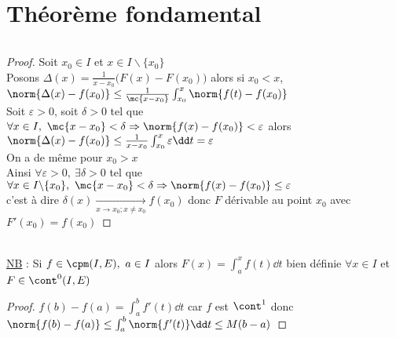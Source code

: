 {\section{Théorème fondamental}
    ${}$ \\ 
    \begin{proof}
    Soit $x_0 \in I$ et $x\in I\backslash \{x_0\}$ \\Posons $\Delta (x) = \frac{1}{x-x_0}\big( F(x) - F(x_0)\big)$ alors si $x_0<x$, 
    $\norm{\Delta (x) - f(x_0)} \leq  \frac{1}{\mc{x-x_0}} \int_{x_0}^x \norm{f(t) - f(x_0)}$ \\ Soit $\varepsilon >0 $, soit $\delta >0$ tel 
    que $\forall x\in I ,~\mc{x-x_0} <\delta \Rightarrow \norm{f(x)-f(x_0)} <\varepsilon$ alors \\$\norm{\Delta (x) - f(x_0)} \leq 
    \frac{1}{x-x_0} \int_{x_0}^x \varepsilon \dd t = \varepsilon$ \\ On a de même pour $x_0 > x$\\
    Ainsi $\forall \varepsilon > 0 ,~\exists \delta >0$ tel que $\forall x\in I \backslash \{x_0\} ,~\mc{x-x_0} <\delta \Rightarrow 
    \norm{f(x) - f(x_0)} \leq \varepsilon$ \\c'est à dire $\delta (x) \underset{x\rightarrow x_0 ; x\neq x_0}{\longrightarrow} f(x_0)$ donc $F$ 
    dérivable au point $x_0$ avec $F'(x_0) = f(x_0)$
    \end{proof}
    ${}$ \\ 
    \\ {\small\underline{NB} : Si $f\in\cpm (I,E) ,~a\in I$ alors $F(x) = \int_a^x f(t) \dd t$ bien définie $\forall x\in I$ et 
    $F\in\cont^0(I,E)$}
    \vspace*{0.5cm} \\ 
    \begin{proof}
    $f(b)-f(a) = \int_a^b f'(t) \dd t $ car $f$ est $\cont^1$ donc $\norm{f(b)-f(a)} \leq \int_a^b \norm{f'(t)}\dd t \leq M(b-a)$

\end{proof}}
